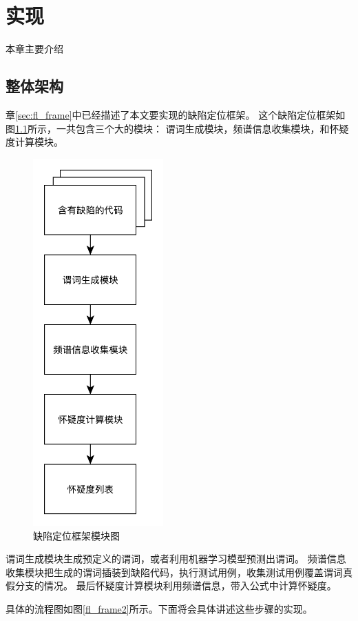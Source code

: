 \chapter{实现}

本章主要介绍

\section{整体架构}

章\ref{sec:fl_frame}中已经描述了本文要实现的缺陷定位框架。
这个缺陷定位框架如图\ref{fl_frame1}所示，一共包含三个大的模块：
谓词生成模块，频谱信息收集模块，和怀疑度计算模块。
\begin{figure}[htbp] 
\centering 
\includegraphics[width=5cm]{figure/frame1} 
\caption{缺陷定位框架模块图} 
\label{fl_frame1}
\end{figure}

谓词生成模块生成预定义的谓词，或者利用机器学习模型预测出谓词。
频谱信息收集模块把生成的谓词插装到缺陷代码，执行测试用例，收集测试用例覆盖谓词真假分支的情况。
最后怀疑度计算模块利用频谱信息，带入公式中计算怀疑度。

具体的流程图如图\ref{fl_frame2}所示。下面将会具体讲述这些步骤的实现。

